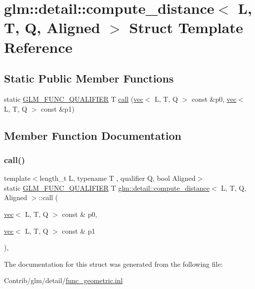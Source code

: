 \hypertarget{structglm_1_1detail_1_1compute__distance}{}\section{glm\+:\+:detail\+:\+:compute\+\_\+distance$<$ L, T, Q, Aligned $>$ Struct Template Reference}
\label{structglm_1_1detail_1_1compute__distance}
\subsection*{Static Public Member Functions}
\begin{DoxyCompactItemize}
\item 
static \mbox{\hyperlink{setup_8hpp_a33fdea6f91c5f834105f7415e2a64407}{G\+L\+M\+\_\+\+F\+U\+N\+C\+\_\+\+Q\+U\+A\+L\+I\+F\+I\+ER}} T \mbox{\hyperlink{structglm_1_1detail_1_1compute__distance_ac6bc3143c4460c61c56db42c2df5a8f8}{call}} (\mbox{\hyperlink{structglm_1_1vec}{vec}}$<$ L, T, Q $>$ const \&p0, \mbox{\hyperlink{structglm_1_1vec}{vec}}$<$ L, T, Q $>$ const \&p1)
\end{DoxyCompactItemize}


\subsection{Member Function Documentation}
\mbox{\label{structglm_1_1detail_1_1compute__distance_ac6bc3143c4460c61c56db42c2df5a8f8}} 
\subsubsection{\texorpdfstring{call()}{call()}}
{\footnotesize\ttfamily template$<$length\+\_\+t L, typename T , qualifier Q, bool Aligned$>$ \\
static \mbox{\hyperlink{setup_8hpp_a33fdea6f91c5f834105f7415e2a64407}{G\+L\+M\+\_\+\+F\+U\+N\+C\+\_\+\+Q\+U\+A\+L\+I\+F\+I\+ER}} T \mbox{\hyperlink{structglm_1_1detail_1_1compute__distance}{glm\+::detail\+::compute\+\_\+distance}}$<$ L, T, Q, Aligned $>$\+::call (\begin{DoxyParamCaption}\item[{\mbox{\hyperlink{structglm_1_1vec}{vec}}$<$ L, T, Q $>$ const \&}]{p0,  }\item[{\mbox{\hyperlink{structglm_1_1vec}{vec}}$<$ L, T, Q $>$ const \&}]{p1 }\end{DoxyParamCaption})\hspace{0.3cm}{\ttfamily [inline]}, {\ttfamily [static]}}



The documentation for this struct was generated from the following file\+:\begin{DoxyCompactItemize}
\item 
Contrib/glm/detail/\mbox{\hyperlink{func__geometric_8inl}{func\+\_\+geometric.\+inl}}\end{DoxyCompactItemize}
